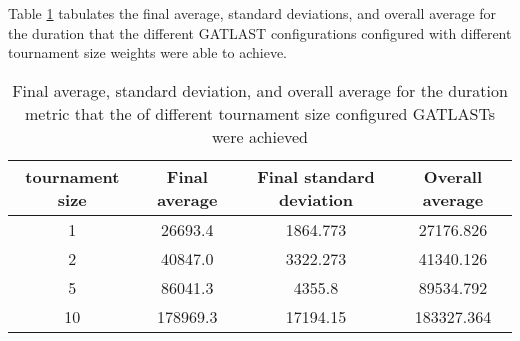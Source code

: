 Table \ref{tab:HP:GA:tournamentSize:duration} tabulates the final average, standard deviations, and overall average for the duration that the different GATLAST configurations configured with different tournament size weights were able to achieve.
\begin{table}[tbh!]
\centering
\begin{adjustbox}{trim=0cm 0cm 0cm 0cm, clip=true}
\begin{tabular}{|c|c|c|c|}
\hline
tournament size & Final average & Final standard deviation & Overall average\\
\hline
1 & 26693.4 & 1864.773 & 27176.826\\\hline
2 & 40847.0 & 3322.273 & 41340.126\\\hline
5 & 86041.3 & 4355.8 & 89534.792\\\hline
10 & 178969.3 & 17194.15 & 183327.364\\\hline
\end{tabular}
\end{adjustbox}
\caption{Final average, standard deviation, and overall average for the duration metric that the of different tournament size configured GATLASTs were achieved}
\label{tab:HP:GA:tournamentSize:duration}
\end{table}